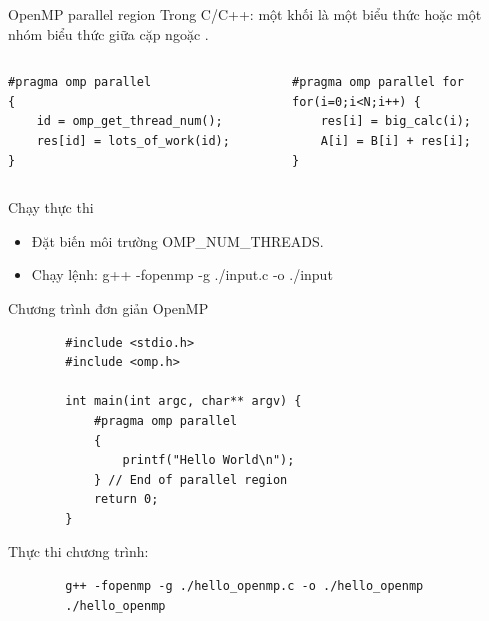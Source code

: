 \documentclass[10pt]{beamer}
\theoremstyle{remark}
\numberwithin{algocf}{section}
\numberwithin{equation}{section}
\numberwithin{dl}{section}
\numberwithin{figure}{section}
\begin{document}
\begin{frame}[fragile]{OpenMP parallel region}
    Trong C/C++: một khối là một biểu thức hoặc một nhóm biểu thức giữa cặp ngoặc { }.
    \begin{columns}[onlytextwidth]
        \begin{column}{0.5\linewidth}
            \begin{verbatim}
#pragma omp parallel
{
    id = omp_get_thread_num();
    res[id] = lots_of_work(id);
}
            \end{verbatim}
        \end{column}
        \begin{column}{0.5\linewidth}
            \begin{verbatim}
#pragma omp parallel for
for(i=0;i<N;i++) {
    res[i] = big_calc(i);
    A[i] = B[i] + res[i];
} 
            \end{verbatim}
        \end{column}
    \end{columns}
\end{frame}

\begin{frame}{Chạy thực thi}
    \begin{itemize}
        \item Đặt biến môi trường OMP\_NUM\_THREADS.
        \item Chạy lệnh: g++ -fopenmp -g ./input.c -o ./input
    \end{itemize}
\end{frame}

\begin{frame}[fragile]{Chương trình đơn giản OpenMP}
    \begin{verbatim}
        #include <stdio.h>
        #include <omp.h>

        int main(int argc, char** argv) {
            #pragma omp parallel
            {
                printf("Hello World\n");
            } // End of parallel region 
            return 0;
        }
    \end{verbatim}
    Thực thi chương trình:
    \begin{verbatim}
        g++ -fopenmp -g ./hello_openmp.c -o ./hello_openmp
        ./hello_openmp
    \end{verbatim}
\end{frame}
\end{document}
